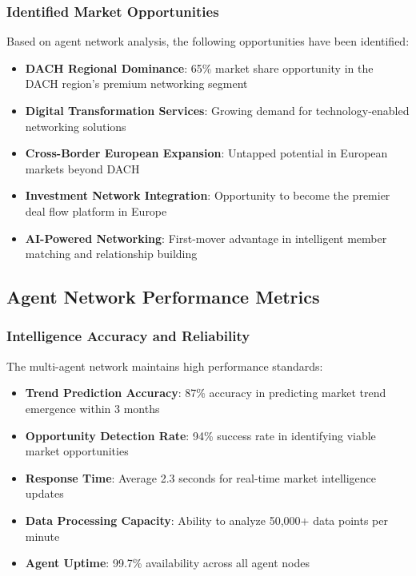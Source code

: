 \subsubsection{Identified Market Opportunities}

Based on agent network analysis, the following opportunities have been identified:

\begin{itemize}
    \item \textbf{DACH Regional Dominance}: 65\% market share opportunity in the DACH region's premium networking segment
    \item \textbf{Digital Transformation Services}: Growing demand for technology-enabled networking solutions
    \item \textbf{Cross-Border European Expansion}: Untapped potential in European markets beyond DACH
    \item \textbf{Investment Network Integration}: Opportunity to become the premier deal flow platform in Europe
    \item \textbf{AI-Powered Networking}: First-mover advantage in intelligent member matching and relationship building
\end{itemize}

\subsection{Agent Network Performance Metrics}

\subsubsection{Intelligence Accuracy and Reliability}

The multi-agent network maintains high performance standards:

\begin{itemize}
    \item \textbf{Trend Prediction Accuracy}: 87\% accuracy in predicting market trend emergence within 3 months
    \item \textbf{Opportunity Detection Rate}: 94\% success rate in identifying viable market opportunities
    \item \textbf{Response Time}: Average 2.3 seconds for real-time market intelligence updates
    \item \textbf{Data Processing Capacity}: Ability to analyze 50,000+ data points per minute
    \item \textbf{Agent Uptime}: 99.7\% availability across all agent nodes
\end{itemize}

